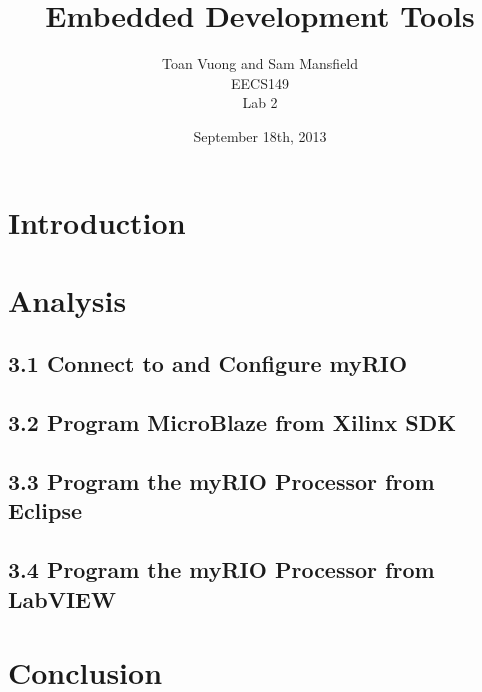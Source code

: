 \documentclass[10pt]{article}
\begin{document}
\title{Embedded Development Tools}
\author{Toan Vuong and Sam Mansfield\\
        EECS149\\
        Lab 2}
\date{September 18th, 2013}
\maketitle

\section*{Introduction}
\section*{Analysis}
  \subsection*{3.1 Connect to and Configure myRIO}
  \subsection*{3.2 Program MicroBlaze from Xilinx SDK}
  \subsection*{3.3 Program the myRIO Processor from Eclipse}
  \subsection*{3.4 Program the myRIO Processor from LabVIEW}
\section*{Conclusion}
\end{document}
